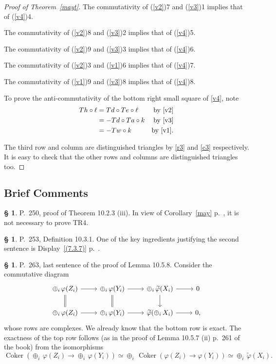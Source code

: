 \documentclass[12pt]{article}
\theoremstyle{remark}
\theoremstyle{definition}
\newtheorem{s}[thm]{\S}
\newcommand{\pp}{\varphi}
\DeclareMathOperator{\Coker}{Coker}
\begin{document}
\begin{proof}[Proof of Theorem~\ref{mayt}]
The commutativity of (\ref{v2})7 and (\ref{v3})1 implies that of (\ref{v4})4.

The commutativity of (\ref{v2})8 and (\ref{v3})2 implies that of (\ref{v4})5. 

The commutativity of (\ref{v2})9 and (\ref{v3})3 implies that of (\ref{v4})6. 

The commutativity of (\ref{v2})3 and (\ref{v1})6 implies that of (\ref{v4})7. 

The commutativity of (\ref{v1})9 and (\ref{v3})8 implies that of (\ref{v4})8. 

To prove the anti-commutativity of the bottom right small square of \eqref{v4}, note 
%
\begin{align*}
Th\circ\ell&=Td\circ Te\circ\ell&\text{by \eqref{v2}}\\ 
&=-Td\circ Ta\circ k&\text{by \eqref{v3}}\\  
&=-Tw\circ k&\text{by \eqref{v1}}.
\end{align*} 

The third row and column are distinguished triangles by \eqref{r3} and \eqref{c3} respectively. It is easy to check that the other rows and columns are distinguished triangles too.
\end{proof}


\subsection{Brief Comments}

\begin{s} 
P.~250, proof of Theorem 10.2.3 (iii). In view of Corollary~\ref{may} p.~\pageref{may}, it is not necessary to prove TR4.
\end{s}

%

\begin{s} 
P.~253, Definition 10.3.1. One of the key ingredients justifying the second sentence is Display~\eqref{(7.3.7)} p.~\pageref{(7.3.7)}.
\end{s}

%

\begin{s} P.~263, last sentence of the proof of Lemma 10.5.8. Consider the commutative diagram  
$$
\begin{tikzcd}
\oplus_i\,\pp(Z_i)\ar[equal]{d}\ar{r}&\oplus_i\,\pp(Y_i)\ar[equal]{d}\ar{r}&\oplus_i\,\widetilde\pp(X_i)\ar{d}\ar{r}&0\\ 
\oplus_i\,\pp(Z_i)\ar{r}&\oplus_i\,\pp(Y_i)\ar{r}&\widetilde\pp(\oplus_i\,X_i)\ar{r}&0, 
\end{tikzcd}
$$ 
whose rows are complexes. We already know that the bottom row is exact. The exactness of the top row follows (as in the proof of Lemma 10.5.7 (ii) p.~261 of the book) from the isomorphisms 
$$
\Coker(\oplus_i\,\pp(Z_i)\to\oplus_i\,\pp(Y_i))\simeq\oplus_i\,\Coker(\pp(Z_i)\to\pp(Y_i))\simeq\oplus_i\,\widetilde\pp(X_i).
$$
\end{s}
\end{document}
